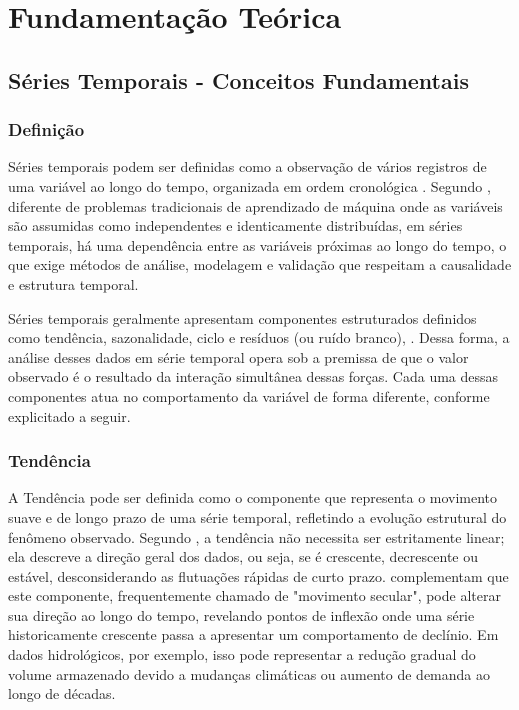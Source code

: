 \chapter{Fundamentação Teórica}\label{cap:fundamentacao}

\section{Séries Temporais - Conceitos Fundamentais}

\subsection{Definição}

Séries temporais podem ser definidas como a observação de vários registros de uma variável ao longo do tempo, organizada em ordem cronológica \cite{Nielsen}. Segundo \textcite{Hyndman_Athanassopoulos}, diferente de problemas tradicionais de aprendizado de máquina onde as variáveis são assumidas como independentes e identicamente distribuídas, em séries temporais, há uma dependência entre as variáveis próximas ao longo do tempo, o que exige métodos de análise, modelagem e validação que respeitam a causalidade e estrutura temporal.  

Séries temporais geralmente apresentam componentes estruturados definidos como tendência, sazonalidade, ciclo e resíduos (ou ruído branco), \cite{Hyndman_Athanassopoulos}. Dessa forma, a análise desses dados em série temporal opera sob a premissa de que o valor observado é o resultado da interação simultânea dessas forças. Cada uma dessas componentes atua no comportamento da variável de forma diferente, conforme explicitado a seguir. 

\subsection{Tendência}

A Tendência pode ser definida como o componente que representa o movimento suave e de longo prazo de uma série temporal, refletindo a evolução estrutural do fenômeno observado. Segundo \textcite{Hyndman_Athanassopoulos}, a tendência não necessita ser estritamente linear; ela descreve a direção geral dos dados, ou seja, se é crescente, decrescente ou estável, desconsiderando as flutuações rápidas de curto prazo. \textcite{Morettin_Toloi} complementam que este componente, frequentemente chamado de "movimento secular", pode alterar sua direção ao longo do tempo, revelando pontos de inflexão onde uma série historicamente crescente passa a apresentar um comportamento de declínio. Em dados hidrológicos, por exemplo, isso pode representar a redução gradual do volume armazenado devido a mudanças climáticas ou aumento de demanda ao longo de décadas. 

